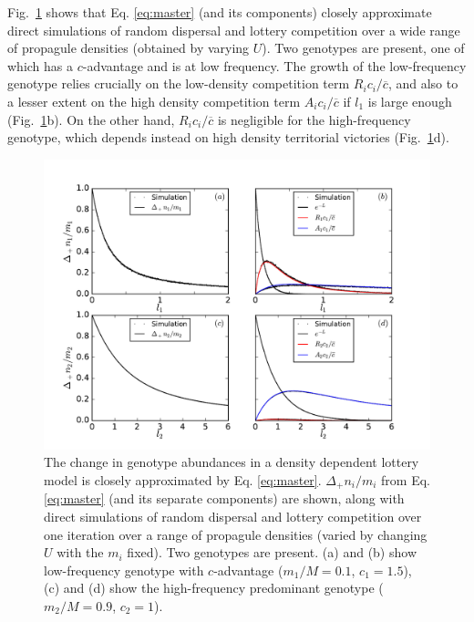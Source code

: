 \documentclass[11pt]{article}
\begin{document}
Fig.~\ref{fig:simcomp} shows that Eq. \eqref{eq:master} (and its components) closely approximate direct simulations of random dispersal and lottery competition over a wide range of propagule densities (obtained by varying $U$). Two genotypes are present, one of which has a $c$-advantage and is at low frequency. The growth of the low-frequency genotype relies crucially on the low-density competition term $R_i c_i/\overline{c}$, and also to a lesser extent on the high density competition term $A_i c_i/\overline{c}$ if $l_1$ is large enough (Fig.~\ref{fig:simcomp}b). On the other hand, $R_i c_i/\overline{c}$ is negligible for the high-frequency genotype, which depends instead on high density territorial victories (Fig.~\ref{fig:simcomp}d). 

\begin{figure}
\centering
\includegraphics[scale=0.7]{simulationcomparison.pdf}
\caption{\label{fig:simcomp} The change in genotype abundances in a density dependent lottery model is closely approximated by Eq. \eqref{eq:master}. $\Delta_+ n_i/m_i$ from Eq. \eqref{eq:master} (and its separate components) are shown, along with direct simulations of random dispersal and lottery competition over one iteration over a range of propagule densities (varied by changing $U$ with the $m_i$ fixed). Two genotypes are present. (a) and (b) show low-frequency genotype with $c$-advantage ($m_1/M=0.1$, $c_1=1.5$), (c) and (d) show the high-frequency predominant genotype ($m_2/M=0.9$, $c_2=1$).} 
\end{figure}

\end{document}
